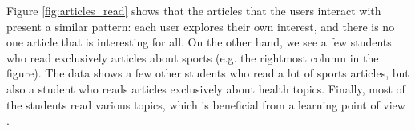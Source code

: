 Figure \ref{fig:articles_read} shows that the articles that the users interact with present a similar pattern: each user explores their own interest, and there is no one article that is interesting for all. 
% 
% 
On the other hand, we see a few students who read exclusively articles about sports (e.g. the rightmost column in the figure). The data shows a few other students who read a lot of sports articles, but also a student who reads articles exclusively about health topics. Finally, most of the students read various topics, which is beneficial from a learning point of view \cite{renadya07-power}.


  


